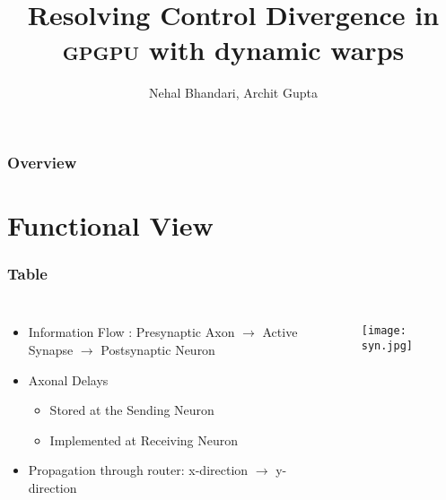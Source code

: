 \documentclass{beamer}
\title[\textsc{Control Divergence}]{Resolving Control Divergence in \textsc{gpgpu} with dynamic warps}
\author{Nehal Bhandari, Archit Gupta} %
\institute[IITB] %
{
\textsc{Indian Institute of Technology, Mumbai} \\ %
}
\begin{document}
\begin{frame}
\titlepage %
\end{frame}

\begin{frame}
\frametitle{Overview} %
\tableofcontents %
\end{frame}


\section{Functional View}

\begin{frame}
\frametitle{Table}
\begin{columns}[c]
	\begin{itemize}
		\item Information Flow : Presynaptic Axon $\rightarrow$ Active Synapse $\rightarrow$ Postsynaptic Neuron
		\item Axonal Delays
		\begin{itemize}
			\item Stored at the Sending Neuron 
			\item Implemented at Receiving Neuron
		\end{itemize} 
		\item Propagation through router: x-direction $\rightarrow$ y-direction
	\end{itemize}

	\begin{figure}
	\texttt{[image: syn.jpg]}
	\end{figure}

\end{columns}
\end{frame}
\end{document}
